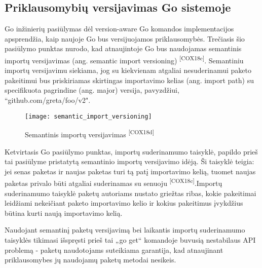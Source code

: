 \subsection{Priklausomybių versijavimas Go sistemoje}

Go inžinierių pasiūlymas dėl version-aware Go komandos implementacijos apsprendžia, kaip naujoje
Go bus versijuojamos priklausomybės. Trečiasis šio pasiūlymo punktas nurodo, kad atnaujintoje Go bus
naudojamas semantinis importų versijavimas (ang. semantic import versioning) \textsuperscript{[COX18c]}.
Semantiniu importų versijavimu siekiama, jog su kiekvienam atgaliai nesuderinamui paketo pakeitimui bus priskiriamas
skirtingas importavimo kelias (ang. import path) su specifikuota pagrindine (ang. major) versija, pavyzdžiui, “github.com/greta/foo/v2".

\begin{figure}[H]
    \centering
    \texttt{[image: semantic\_import\_versioning]}
    \caption{Semantinis importų versijavimas \textsuperscript{[COX18d]}}
\end{figure}

Ketvirtasis Go pasiūlymo punktas, importų suderinamumo taisyklė, papildo prieš
tai pasiūlyme pristatytą semantinio importų versijavimo idėją. Ši taisyklė teigia: jei
senas paketas ir naujas paketas turi tą patį importavimo kelią, tuomet naujas paketas privalo būti atgaliai
suderinamas su senuoju \textsuperscript{[COX18c]}.Importų suderinamumo taisyklė paketų autoriams nustato griežtas ribas, kokie pakeitimai leidžiami
nekeičiant paketo importavimo kelio ir kokius pakeitimus įvykdžius būtina kurti naują importavimo kelią.

Naudojant semantinį paketų versijavimą bei laikantis importų suderinamumo taisyklės tikimasi išspręsti prieš tai „go get“
komandoje buvusią nestabilaus API problemą - paketų naudotojams suteikiama garantija,
kad atnaujinant priklausomybes jų naudojamų paketų metodai nesikeis.
